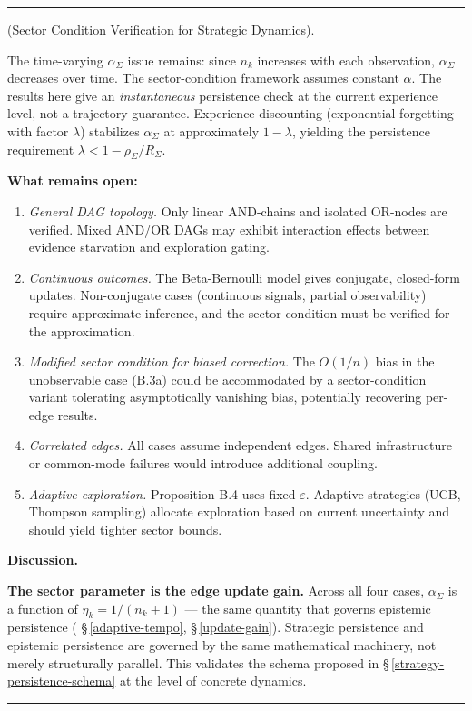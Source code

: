 \documentclass[11pt,oneside]{article}
\newcounter{claim}[section]
\renewcommand{\theclaim}{\thesection.\arabic{claim}}
\newenvironment{segment}[2]{%
  \refstepcounter{claim}%
  \bigskip\noindent\hrule\smallskip
  \noindent{\bfseries #1~\theclaim}\enskip(#2).\par\smallskip
  \noindent\ignorespaces
}{%
  \par\smallskip\noindent\hrule\bigskip
}
\newenvironment{derivation}[1][]{\begin{segment}{Derivation}{#1}}{\end{segment}}
\begin{document}
\begin{derivation}[Sector Condition Verification for Strategic Dynamics]
The time-varying $\alpha_\Sigma$ issue remains: since $n_k$ increases with each observation, $\alpha_\Sigma$ decreases over time. The sector-condition framework assumes constant $\alpha$. The results here give an \textit{instantaneous} persistence check at the current experience level, not a trajectory guarantee. Experience discounting (exponential forgetting with factor $\lambda$) stabilizes $\alpha_\Sigma$ at approximately $1 - \lambda$, yielding the persistence requirement $\lambda < 1 - \rho_\Sigma/R_\Sigma$.

\textbf{What remains open:}

\begin{enumerate}
  \item \textit{General DAG topology.} Only linear AND-chains and isolated OR-nodes are verified. Mixed AND/OR DAGs may exhibit interaction effects between evidence starvation and exploration gating.
  \item \textit{Continuous outcomes.} The Beta-Bernoulli model gives conjugate, closed-form updates. Non-conjugate cases (continuous signals, partial observability) require approximate inference, and the sector condition must be verified for the approximation.
  \item \textit{Modified sector condition for biased correction.} The $O(1/n)$ bias in the unobservable case (B.3a) could be accommodated by a sector-condition variant tolerating asymptotically vanishing bias, potentially recovering per-edge results.
  \item \textit{Correlated edges.} All cases assume independent edges. Shared infrastructure or common-mode failures would introduce additional coupling.
  \item \textit{Adaptive exploration.} Proposition B.4 uses fixed $\varepsilon$. Adaptive strategies (UCB, Thompson sampling) allocate exploration based on current uncertainty and should yield tighter sector bounds.
\end{enumerate}




\medskip\noindent\textbf{Discussion.}


\textbf{The sector parameter is the edge update gain.} Across all four cases, $\alpha_\Sigma$ is a function of $\eta_k = 1/(n_k+1)$ --- the same quantity that governs epistemic persistence ( \S\,\ref{adaptive-tempo}, \S\,\ref{update-gain}). Strategic persistence and epistemic persistence are governed by the same mathematical machinery, not merely structurally parallel. This validates the schema proposed in \S\,\ref{strategy-persistence-schema} at the level of concrete dynamics.


\end{derivation}
\end{document}
